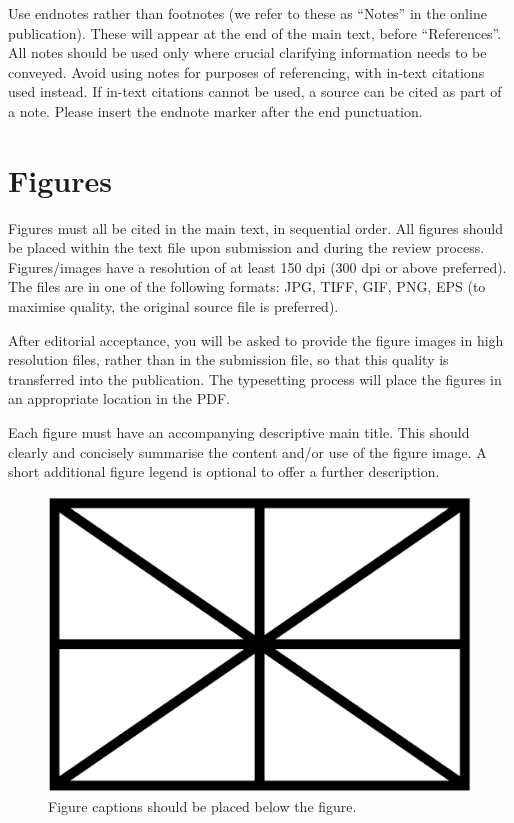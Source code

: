 \documentclass{article}
\begin{document}
Use endnotes rather than footnotes
(we refer to these as ``Notes'' in the online publication).
These will appear at the end of the main text, before ``References''.
All notes should be used only where crucial clarifying information
needs to be conveyed.
Avoid using notes for purposes of referencing, with in-text citations used
instead.
If in-text citations cannot be used, a source can be cited as part of a note.
Please insert the endnote marker after the end punctuation.

\section{Figures}\label{sec:figures}

Figures must all be cited in the main text, in sequential order.
All figures should be placed within the text file upon submission and during
the review process. Figures/images have a resolution of at least 150 dpi
(300 dpi or above preferred). The files are in one of the following formats:
JPG, TIFF, GIF, PNG, EPS (to maximise quality,
the original source file is preferred).

After editorial acceptance, you will be asked to provide the figure
images in high resolution files, rather than in the submission file,
so that this quality is transferred into the publication.
The typesetting process will place the figures in an appropriate
location in the PDF.

Each figure must have an accompanying descriptive main title.
This should clearly and concisely summarise the content and/or
use of the figure image.
A short additional figure legend is optional to offer a further description.

\begin{figure}[htbp]
  \centering
  \includegraphics[width=0.85\columnwidth]{figs/figure}
  \caption{Figure captions should be placed below the figure.}
  \label{fig:figure}
\end{figure}
\end{document}
